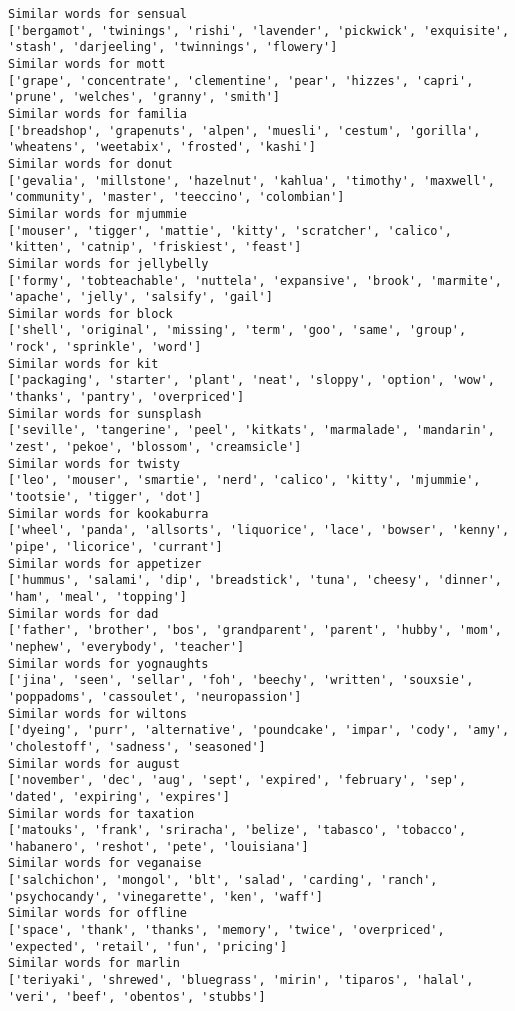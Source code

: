 \documentclass[11pt]{article}
\begin{document}
\begin{Verbatim}[commandchars=\\\{\}]
Similar words for sensual
['bergamot', 'twinings', 'rishi', 'lavender', 'pickwick', 'exquisite', 'stash', 'darjeeling', 'twinnings', 'flowery']
Similar words for mott
['grape', 'concentrate', 'clementine', 'pear', 'hizzes', 'capri', 'prune', 'welches', 'granny', 'smith']
Similar words for familia
['breadshop', 'grapenuts', 'alpen', 'muesli', 'cestum', 'gorilla', 'wheatens', 'weetabix', 'frosted', 'kashi']
Similar words for donut
['gevalia', 'millstone', 'hazelnut', 'kahlua', 'timothy', 'maxwell', 'community', 'master', 'teeccino', 'colombian']
Similar words for mjummie
['mouser', 'tigger', 'mattie', 'kitty', 'scratcher', 'calico', 'kitten', 'catnip', 'friskiest', 'feast']
Similar words for jellybelly
['formy', 'tobteachable', 'nuttela', 'expansive', 'brook', 'marmite', 'apache', 'jelly', 'salsify', 'gail']
Similar words for block
['shell', 'original', 'missing', 'term', 'goo', 'same', 'group', 'rock', 'sprinkle', 'word']
Similar words for kit
['packaging', 'starter', 'plant', 'neat', 'sloppy', 'option', 'wow', 'thanks', 'pantry', 'overpriced']
Similar words for sunsplash
['seville', 'tangerine', 'peel', 'kitkats', 'marmalade', 'mandarin', 'zest', 'pekoe', 'blossom', 'creamsicle']
Similar words for twisty
['leo', 'mouser', 'smartie', 'nerd', 'calico', 'kitty', 'mjummie', 'tootsie', 'tigger', 'dot']
Similar words for kookaburra
['wheel', 'panda', 'allsorts', 'liquorice', 'lace', 'bowser', 'kenny', 'pipe', 'licorice', 'currant']
Similar words for appetizer
['hummus', 'salami', 'dip', 'breadstick', 'tuna', 'cheesy', 'dinner', 'ham', 'meal', 'topping']
Similar words for dad
['father', 'brother', 'bos', 'grandparent', 'parent', 'hubby', 'mom', 'nephew', 'everybody', 'teacher']
Similar words for yognaughts
['jina', 'seen', 'sellar', 'foh', 'beechy', 'written', 'souxsie', 'poppadoms', 'cassoulet', 'neuropassion']
Similar words for wiltons
['dyeing', 'purr', 'alternative', 'poundcake', 'impar', 'cody', 'amy', 'cholestoff', 'sadness', 'seasoned']
Similar words for august
['november', 'dec', 'aug', 'sept', 'expired', 'february', 'sep', 'dated', 'expiring', 'expires']
Similar words for taxation
['matouks', 'frank', 'sriracha', 'belize', 'tabasco', 'tobacco', 'habanero', 'reshot', 'pete', 'louisiana']
Similar words for veganaise
['salchichon', 'mongol', 'blt', 'salad', 'carding', 'ranch', 'psychocandy', 'vinegarette', 'ken', 'waff']
Similar words for offline
['space', 'thank', 'thanks', 'memory', 'twice', 'overpriced', 'expected', 'retail', 'fun', 'pricing']
Similar words for marlin
['teriyaki', 'shrewed', 'bluegrass', 'mirin', 'tiparos', 'halal', 'veri', 'beef', 'obentos', 'stubbs']

\end{Verbatim}
\end{document}
